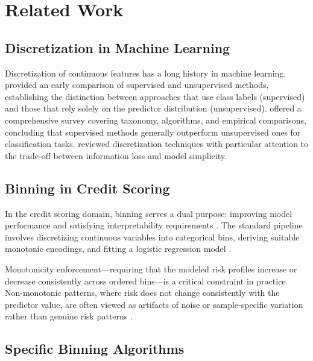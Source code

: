 \documentclass[11pt]{article}
\begin{document}
\section{Related Work}
\label{sec:related}

\subsection{Discretization in Machine Learning}

Discretization of continuous features has a long history in machine learning. \citet{dougherty1995supervised} provided an early comparison of supervised and unsupervised methods, establishing the distinction between approaches that use class labels (supervised) and those that rely solely on the predictor distribution (unsupervised). \citet{garcia2013survey} offered a comprehensive survey covering taxonomy, algorithms, and empirical comparisons, concluding that supervised methods generally outperform unsupervised ones for classification tasks. \citet{kotsiantis2006discretization} reviewed discretization techniques with particular attention to the trade-off between information loss and model simplicity.

\subsection{Binning in Credit Scoring}

In the credit scoring domain, binning serves a dual purpose: improving model performance and satisfying interpretability requirements \citep{siddiqi2012credit}. The standard pipeline involves discretizing continuous variables into categorical bins, deriving suitable monotonic encodings, and fitting a logistic regression model \citep{anderson2007credit, mays2004credit}.

Monotonicity enforcement---requiring that the modeled risk profiles increase or decrease consistently across ordered bins---is a critical constraint in practice. Non-monotonic patterns, where risk does not change consistently with the predictor value, are often viewed as artifacts of noise or sample-specific variation rather than genuine risk patterns \citep{siddiqi2012credit}.

\subsection{Specific Binning Algorithms}
\end{document}
